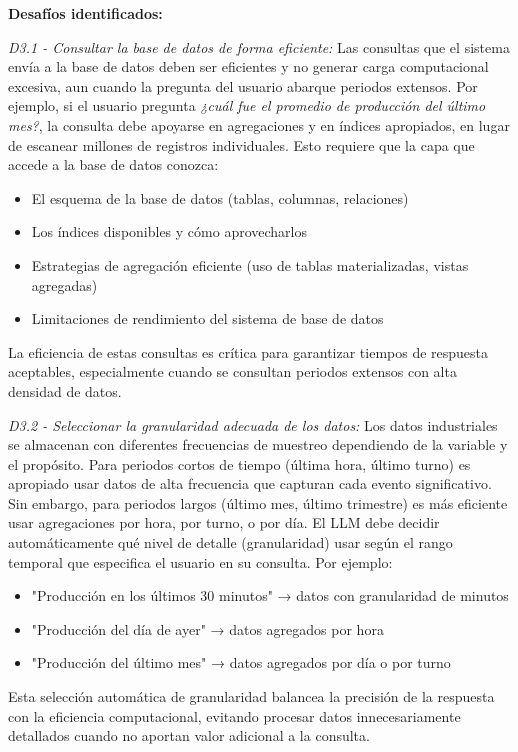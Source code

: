\textbf{Desafíos identificados:}

\label{des:D3.1}
\textit{D3.1 - Consultar la base de datos de forma eficiente:} Las consultas que el sistema envía a la base de datos deben ser eficientes y no generar carga computacional excesiva, aun cuando la pregunta del usuario abarque periodos extensos. Por ejemplo, si el usuario pregunta \textit{¿cuál fue el promedio de producción del último mes?}, la consulta debe apoyarse en agregaciones y en índices apropiados, en lugar de escanear millones de registros individuales. Esto requiere que la capa que accede a la base de datos conozca:
\begin{itemize}
    \item El esquema de la base de datos (tablas, columnas, relaciones)
    \item Los índices disponibles y cómo aprovecharlos
    \item Estrategias de agregación eficiente (uso de tablas materializadas, vistas agregadas)
    \item Limitaciones de rendimiento del sistema de base de datos
\end{itemize}

La eficiencia de estas consultas es crítica para garantizar tiempos de respuesta aceptables, especialmente cuando se consultan periodos extensos con alta densidad de datos.

\label{des:D3.2}
\textit{D3.2 - Seleccionar la granularidad adecuada de los datos:} Los datos industriales se almacenan con diferentes frecuencias de muestreo dependiendo de la variable y el propósito. Para periodos cortos de tiempo (última hora, último turno) es apropiado usar datos de alta frecuencia que capturan cada evento significativo. Sin embargo, para periodos largos (último mes, último trimestre) es más eficiente usar agregaciones por hora, por turno, o por día. El LLM debe decidir automáticamente qué nivel de detalle (granularidad) usar según el rango temporal que especifica el usuario en su consulta. Por ejemplo:
\begin{itemize}
    \item "Producción en los últimos 30 minutos" → datos con granularidad de minutos
    \item "Producción del día de ayer" → datos agregados por hora
    \item "Producción del último mes" → datos agregados por día o por turno
\end{itemize}

Esta selección automática de granularidad balancea la precisión de la respuesta con la eficiencia computacional, evitando procesar datos innecesariamente detallados cuando no aportan valor adicional a la consulta.

